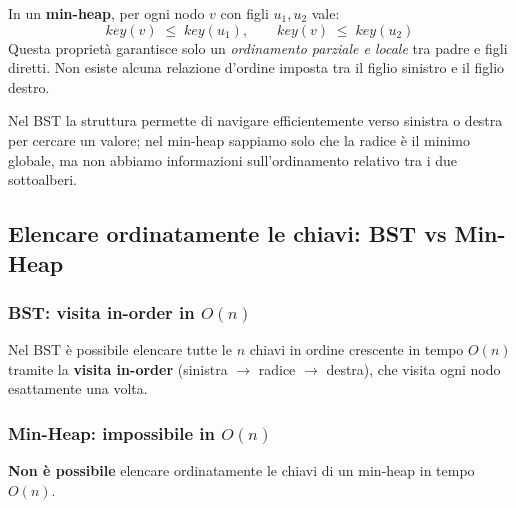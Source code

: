 	\begin{definizione}
		In un \textbf{min-heap}, per ogni nodo $v$ con figli $u_1, u_2$ vale:
		\[
		key(v) \;\leq\; key(u_1), \qquad key(v) \;\leq\; key(u_2)
		\]
		Questa proprietà garantisce solo un \emph{ordinamento parziale e locale} tra padre e figli diretti. Non esiste alcuna relazione d'ordine imposta tra il figlio sinistro e il figlio destro.
	\end{definizione}
	
	\begin{nota}
		Nel BST la struttura permette di navigare efficientemente verso sinistra o destra per cercare un valore; nel min-heap sappiamo solo che la radice è il minimo globale, ma non abbiamo informazioni sull'ordinamento relativo tra i due sottoalberi.
	\end{nota}
	
	\subsection{Elencare ordinatamente le chiavi: BST vs Min-Heap}
	
	\subsubsection{BST: visita in-order in \texorpdfstring{$O(n)$}{O(n)}}
	
	Nel BST è possibile elencare tutte le $n$ chiavi in ordine crescente in tempo $O(n)$ tramite la \textbf{visita in-order} (sinistra $\to$ radice $\to$ destra), che visita ogni nodo esattamente una volta.
	
	\begin{algorithm}[H]
		\caption{\textsc{InOrder}$(v)$}
	\end{algorithm}
	
	\subsubsection{Min-Heap: impossibile in \texorpdfstring{$O(n)$}{O(n)}}
	
	\begin{hardnote}
		\textbf{Non è possibile} elencare ordinatamente le chiavi di un min-heap in tempo $O(n)$.
	\end{hardnote}
	
